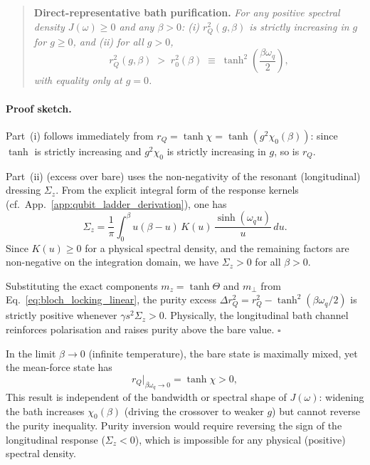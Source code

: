 \begin{quote}
\textbf{Direct-representative bath purification.}\; \textit{For any positive spectral density
$J(\omega)\geq 0$ and any $\beta>0$: (i) $r_Q^2(g,\beta)$ is strictly increasing
in $g$ for $g\geq 0$, and (ii) for all $g>0$,}
\begin{equation}
    r_Q^2(g,\beta) \;>\; r_0^2(\beta) \;\equiv\; \tanh^2\!\left(\frac{\beta\omega_q}{2}\right),
    \label{eq:purity_bound}
\end{equation}
\textit{with equality only at $g=0$.}
\end{quote}

\paragraph{Proof sketch.}
Part~(i) follows immediately from
\(r_Q=\tanh\chi=\tanh(g^2\chi_0(\beta))\): since \(\tanh\) is strictly increasing and
\(g^2\chi_0\) is strictly increasing in \(g\), so is \(r_Q\).

Part~(ii) (excess over bare) uses the non-negativity of the resonant (longitudinal) dressing $\Sigma_z$. From the explicit integral form of the response kernels (cf.\ App.~\ref{app:qubit_ladder_derivation}), one has
\begin{equation}
    \Sigma_z = \frac{1}{\pi}\int_0^\beta u(\beta-u)\,K(u)\,\frac{\sinh(\omega_q u)}{u}\,du.
\end{equation}
Since $K(u)\geq 0$ for a physical spectral density, and the remaining factors are non-negative on the integration domain, we have $\Sigma_z > 0$ for all $\beta>0$. 

Substituting the exact components \(m_z=\tanh\Theta\) and \(m_\perp\) from
Eq.~\eqref{eq:bloch_locking_linear}, the purity excess
\(\Delta r_Q^2=r_Q^2-\tanh^2(\beta\omega_q/2)\) is strictly positive whenever
\(\gamma s^2\Sigma_z>0\). Physically, the longitudinal bath channel reinforces
polarisation and raises purity above the bare value. \(\square\)

In the limit $\beta\to 0$ (infinite temperature), the bare state is maximally mixed, yet the
mean-force state has
\begin{equation}
    r_Q\big|_{\beta\omega_q\to 0} = \tanh\chi > 0,
    \label{eq:purity_highT}
\end{equation}
This result is independent of the bandwidth or spectral shape of $J(\omega)$:
widening the bath increases $\chi_0(\beta)$ (driving the crossover to weaker
$g$) but cannot reverse the purity inequality.  Purity inversion would require
reversing the sign of the longitudinal response ($\Sigma_z < 0$), which is impossible for
any physical (positive) spectral density. 

